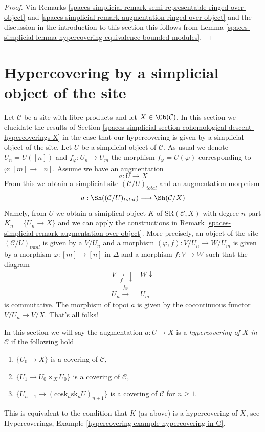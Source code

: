 \begin{proof}
Via Remarks \ref{spaces-simplicial-remark-semi-representable-ringed-over-object} and
\ref{spaces-simplicial-remark-augmentation-ringed-over-object} and the discussion in
the introduction to this section
this follows from Lemma \ref{spaces-simplicial-lemma-hypercovering-equivalence-bounded-modules}.
\end{proof}

\section{Hypercovering by a simplicial object of the site}
\label{spaces-simplicial-section-hypercovering}
Let $\mathcal{C}$ be a site with fibre products and
let $X \in \Ob(\mathcal{C})$.
In this section we elucidate the results of
Section \ref{spaces-simplicial-section-cohomological-descent-hypercoverings-X}
in the case that our hypercovering is given by
a simplicial object of the site.
Let $U$ be a simplicial object of $\mathcal{C}$.
As usual we denote $U_n = U([n])$ and $f_\varphi : U_n \to U_m$
the morphism $f_\varphi = U(\varphi)$ corresponding to
$\varphi : [m] \to [n]$.
Assume we have an augmentation
$$
a : U \to X
$$
From this we obtain a simplicial site $(\mathcal{C}/U)_{total}$
and an augmentation morphism
$$
a : \Sh((\mathcal{C}/U)_{total}) \longrightarrow \Sh(\mathcal{C}/X)
$$
Namely, from $U$ we obtain a simiplical object $K$ of
$\text{SR}(\mathcal{C}, X)$ with degree $n$ part
$K_n = \{U_n \to X\}$ and we can apply the constructions in
Remark \ref{spaces-simplicial-remark-augmentation-over-object}.
More precisely, an object of the site $(\mathcal{C}/U)_{total}$ is given by
a $V/U_n$ and a morphism $(\varphi, f) : V/U_n \to W/U_m$ is given
by a morphism $\varphi : [m] \to [n]$ in $\Delta$ and a morphism
$f : V \to W$ such that the diagram
$$
\begin{array}{cc}V \underset{f}{\longrightarrow}\downarrow & W \downarrow \\ U_n \overset{f_\varphi}{\longrightarrow} & U_m\end{array}
$$
is commutative. The morphism of topoi $a$ is given by the cocontinuous
functor $V/U_n \mapsto V/X$. That's all folks!

\medskip\noindent
In this section we will say the augmentation $a : U \to X$ is a
{\it hypercovering of $X$ in $\mathcal{C}$} if the following hold
\begin{enumerate}
\item $\{U_0 \to X\}$ is a covering of $\mathcal{C}$,
\item $\{U_1 \to U_0 \times_X U_0\}$ is a covering of $\mathcal{C}$,
\item $\{U_{n + 1} \to (\text{cosk}_n\text{sk}_n U)_{n + 1}\}$
is a covering of $\mathcal{C}$ for $n \geq 1$.
\end{enumerate}
This is equivalent to the condition that $K$ (as above) is a hypercovering
of $X$, see
Hypercoverings, Example \ref{hypercovering-example-hypercovering-in-C}.

